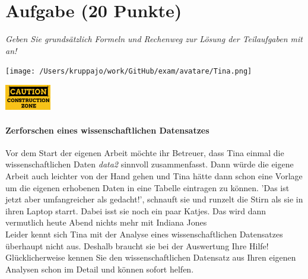 \documentclass[a4paper, 9pt]{scrartcl}\usepackage[]{graphicx}\usepackage[]{xcolor}
\begin{document}
\section{Aufgabe \hfill (20 Punkte)}

\textit{Geben Sie grundsätzlich Formeln und Rechenweg zur Lösung der Teilaufgaben mit an!} \\[1Ex]
 

 
\begin{minipage}[t]{0.5\textwidth}
\texttt{[image: /Users/kruppajo/work/GitHub/exam/avatare/Tina.png]}
\end{minipage}
\begin{minipage}[t]{0.5\textwidth}
\hfill
\href{https://youtu.be/C9skfFRTHhI}{\includegraphics[width = 2cm]{img/caution}}
\end{minipage}



\paragraph{Zerforschen eines wissenschaftlichen Datensatzes}

Vor dem Start der eigenen Arbeit möchte ihr Betreuer, dass Tina einmal die wissenschaftlichen Daten \textit{data2} sinnvoll zusammenfasst. Dann würde die eigene Arbeit auch leichter von der Hand gehen und Tina hätte dann schon eine Vorlage um die eigenen erhobenen Daten in eine Tabelle eintragen zu können. 'Das ist jetzt aber umfangreicher als gedacht!', schnauft sie und runzelt die Stirn als sie in ihren Laptop starrt. Dabei isst sie noch ein paar Katjes. Das wird dann vermutlich heute Abend nichts mehr mit Indiana Jones\\

Leider kennt sich Tina mit der Analyse eines wissenschaftlichen Datensatzes überhaupt nicht aus. Deshalb braucht sie bei der Auswertung Ihre Hilfe! Glücklicherweise kennen Sie den wissenschaftlichen Datensatz aus Ihren eigenen Analysen schon im Detail und können sofort helfen.
\end{document}
